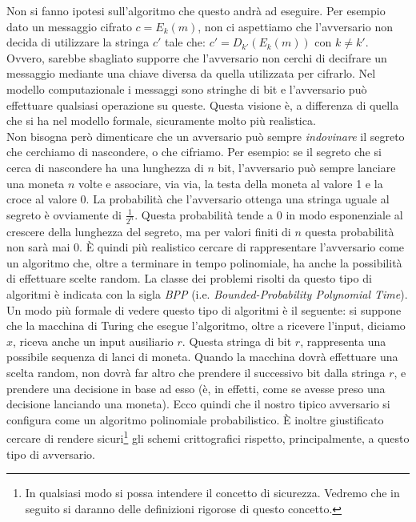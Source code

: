 \documentclass[a4paper,openright,twoside,12pt]{report}
\begin{document}
Non si fanno ipotesi sull'algoritmo che questo andr\`a ad eseguire.
Per esempio dato un messaggio cifrato $c=E_k(m)$, non ci aspettiamo che l'avversario non decida di utilizzare la stringa $c'$ tale che:  $c'=D_{k'}(E_k(m))$ con $k\neq k'$. 
Ovvero, sarebbe sbagliato supporre che l'avversario non cerchi di decifrare un messaggio mediante una chiave diversa 
da quella utilizzata per cifrarlo.
Nel modello computazionale i messaggi sono stringhe di bit e l'avversario pu\`o effettuare qualsiasi operazione su queste. Questa visione \`e, a differenza di quella 
che si ha nel modello formale, sicuramente molto pi\`u realistica\cite{DBLP:conf/crypto/2006}.\\

Non bisogna per\`o dimenticare che un avversario può sempre \emph{indovinare} il segreto che cerchiamo di nascondere, o che cifriamo. 
Per esempio: se il segreto che si cerca di nascondere ha una lunghezza di $n$ bit, l'avversario può sempre
lanciare una moneta $n$ volte e associare, via via, la testa della moneta al valore 1 e la croce al valore 0.
La probabilit\`a che l'avversario ottenga una stringa uguale al segreto \`e ovviamente di $\frac{1}{2^n}$. 
Questa probabilit\`a tende a 0 in modo esponenziale al crescere della lunghezza del segreto, ma per valori finiti di $n$ questa probabilit\`a non sar\`a mai 0.
\`E quindi pi\`u realistico cercare di rappresentare l'avversario come un algoritmo che, oltre a terminare in tempo polinomiale, ha
anche la possibilit\`a di effettuare scelte random.
La classe dei problemi risolti da questo tipo di algoritmi \`e indicata con la
sigla \emph{BPP} (i.e. \emph{Bounded-Probability Polynomial Time}).\\Un modo pi\`u formale di vedere questo tipo di algoritmi \`e il seguente: si suppone che la macchina di Turing che 
esegue l'algoritmo, oltre a ricevere l'input, diciamo $x$, riceva anche un input ausiliario $r$. Questa stringa di bit $r$, rappresenta una possibile sequenza di lanci di moneta.
Quando la macchina dovr\`a effettuare una scelta random, non dovr\`a far altro che prendere il successivo bit dalla stringa $r$, e prendere una decisione in base ad esso
(\`e, in effetti, come se avesse preso una decisione lanciando una moneta). Ecco quindi che il nostro tipico avversario si configura come un algoritmo polinomiale probabilistico.
\`E inoltre giustificato cercare di rendere sicuri\footnote{In qualsiasi modo si possa intendere il concetto di sicurezza. 
Vedremo che in seguito si daranno delle definizioni rigorose di questo concetto.} gli schemi crittografici rispetto, principalmente, a questo tipo di avversario.
\end{document}
